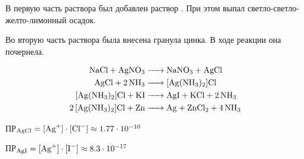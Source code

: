 \documentclass[a4paper, 12pt]{article}
\begin{document}
В первую часть раствора был добавлен раствор . При этом выпал светло-светло-желто-лимонный осадок.

Во вторую часть раствора была внесена гранула цинка. В ходе реакции она почернела.

\begin{align}
	\ce{NaCl + AgNO3 &-> NaNO3 + AgCl}\\
	\ce{AgCl + 2NH3 &-> [Ag(NH3)2]Cl}\\
	\ce{[Ag(NH3)2]Cl + KI &-> AgI + KCl + 2NH3} \\
	\ce{2[Ag(NH3)2]Cl + Zn &-> Ag + ZnCl2 + 4NH3} %
\end{align}


ПР$_{\ce{AgCl}} = [\ce{Ag^+}]\cdot[\ce{Cl^-}] \approx 1.77 \cdot 10^{-10}$

ПР$_{\ce{AgI}} = [\ce{Ag^+}]\cdot[\ce{I^-}] \approx 8.3 \cdot 10^{-17}$
\end{document}
